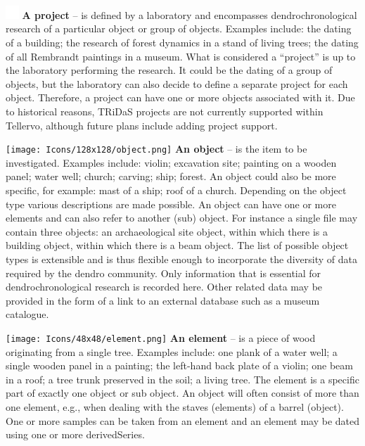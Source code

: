\begin{description}

\item \includegraphics[width=5mm]{Images/pixel.png}  \textbf{A project} -- is defined by a laboratory and encompasses dendrochronological research of a particular object or group of objects.  Examples include: the dating of a building; the research of forest dynamics in a stand of living trees; the dating of all Rembrandt paintings in a museum. What is considered a ``project'' is up to the laboratory performing the research. It could be the dating of a group of objects, but the laboratory can also decide to define a separate project for each object. Therefore, a project can have one or more objects associated with it.  Due to historical reasons, TRiDaS projects are not currently supported within Tellervo, although future plans include adding project support.

\item \texttt{[image: Icons/128x128/object.png]} \textbf{An object} -- is the item to be investigated.  Examples include: violin; excavation site; painting on a wooden panel; water well; church; carving; ship; forest. An object could also be more specific, for example: mast of a ship; roof of a church. Depending on the object type various descriptions are made possible. An object can have one or more elements and can also refer to another (sub) object.  For instance a single file may contain three objects: an archaeological site object, within which there is a building object, within which there is a beam object.  The list of possible object types is extensible and is thus flexible enough to incorporate the diversity of data required by the dendro community.  Only information that is essential for dendrochronological research is recorded here. Other related data may be provided in the form of a link to an external database such as a museum catalogue. 

\item \texttt{[image: Icons/48x48/element.png]} \textbf{An element} -- is a piece of wood originating from a single tree. Examples include: one plank of a water well; a single wooden panel in a painting; the left-hand back plate of a violin; one beam in a roof; a tree trunk preserved in the soil; a living tree. The element is a specific part of exactly one object or sub object.  An object will often consist of more than one element, e.g., when dealing with the staves (elements) of a barrel (object).  One or more samples can be taken from an element and an element may be dated using one or more derivedSeries.


\end{description}
